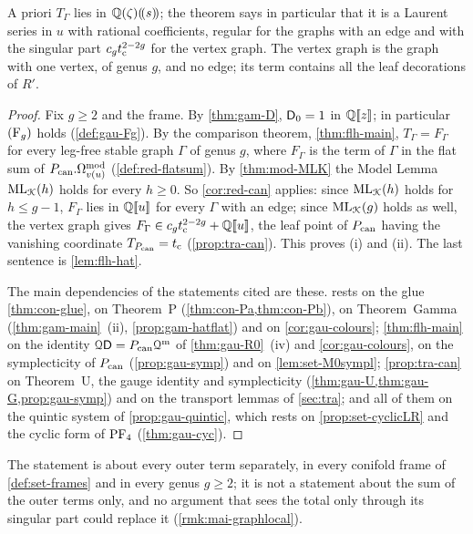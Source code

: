 A priori $T_\Gamma$ lies in $\mathbb{Q}(\zeta)(\!(s)\!)$; the theorem says in particular that it is a Laurent series in $u$ with rational coefficients, regular for the graphs with an edge and with the singular part $c_gt_{\mathrm{c}}^{2-2g}$ for the vertex graph. The vertex graph is the graph with one vertex, of genus $g$, and no edge; its term contains all the leaf decorations of $R'$.

\begin{proof}
Fix $g\geq2$ and the frame. By \cref{thm:gam-D}, $\mathsf{D}_0=1$ in $\mathbb{Q}[\![ z ]\!]$; in particular $(\mathrm{F}_{g})$ holds (\cref{def:gau-Fg}). By the comparison theorem, \cref{thm:flh-main}, $T_\Gamma=F_\Gamma$ for every leg-free stable graph $\Gamma$ of genus $g$, where $F_\Gamma$ is the term of $\Gamma$ in the flat sum of $P_{\mathrm{can}}.\Omega^{\mathrm{mod}}_{v(u)}$ (\cref{def:red-flatsum}). By \cref{thm:mod-MLK} the Model Lemma $\mathrm{ML}_{\mathcal{K}}(h)$ holds for every $h\geq0$. So \cref{cor:red-can} applies: since $\mathrm{ML}_{\mathcal{K}}(h)$ holds for $h\leq g-1$, $F_\Gamma$ lies in $\mathbb{Q}[\![ u ]\!]$ for every $\Gamma$ with an edge; since $\mathrm{ML}_{\mathcal{K}}(g)$ holds as well, the vertex graph gives $F_\Gamma\in c_gt_{\mathrm{c}}^{2-2g}+\mathbb{Q}[\![ u ]\!]$, the leaf point of $P_{\mathrm{can}}$ having the vanishing coordinate $T_{P_{\mathrm{can}}}=t_{\mathrm{c}}$ (\cref{prop:tra-can}). This proves (i) and (ii). The last sentence is \cref{lem:flh-hat}.

The main dependencies of the statements cited are these.  rests on the glue \cref{thm:con-glue}, on Theorem~P (\cref{thm:con-Pa,thm:con-Pb}), on Theorem~Gamma (\cref{thm:gam-main}~(ii), \cref{prop:gam-hatflat}) and on \cref{cor:gau-colours}; \cref{thm:flh-main} on the identity $\mathcal{Q}\mathsf{D}=P_{\mathrm{can}}\mathcal{Q}^{\mathrm m}$ of \cref{thm:gau-R0}~(iv) and \cref{cor:gau-colours}, on the symplecticity of $P_{\mathrm{can}}$ (\cref{prop:gau-symp}) and on \cref{lem:set-M0sympl}; \cref{prop:tra-can} on Theorem~U, the gauge identity and symplecticity (\cref{thm:gau-U,thm:gau-G,prop:gau-symp}) and on the transport lemmas of \cref{sec:tra}; and all of them on the quintic system of \cref{prop:gau-quintic}, which rests on \cref{prop:set-cyclicLR} and the cyclic form of $\mathrm{PF}_{4}$ (\cref{thm:gau-cyc}).
\end{proof}

The statement is about every outer term separately, in every conifold frame of \cref{def:set-frames} and in every genus $g\geq2$; it is not a statement about the sum of the outer terms only, and no argument that sees the total only through its singular part could replace it (\cref{rmk:mai-graphlocal}).

